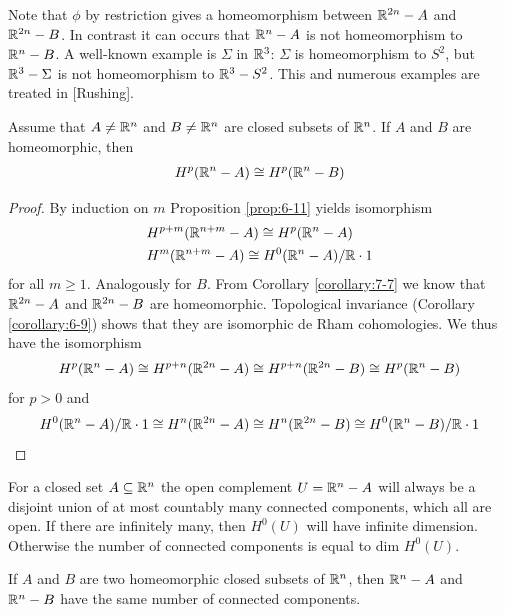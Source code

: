 Note that $\phi$ by restriction gives a homeomorphism between ${\mathbb{R}}^{2n}-A$ and ${\mathbb{R}}^{2n}-B$.
In contrast it can occurs that ${\mathbb{R}}^n-A$ is not homeomorphism to ${\mathbb{R}}^n-B$. A well-known example 
is  $\Sigma$ in ${\mathbb{R}}^3$: $\Sigma$ is homeomorphism to $S^2$, but 
${\mathbb{R}}^3-\Sigma$ is not homeomorphism to ${\mathbb{R}}^3-S^2$. This and numerous examples are treated in [Rushing].


\begin{theorem}\label{theorem:7-8}
  Assume that $A\neq{\ensuremath{\mathbb{R}}}^n$ and $B\neq{\ensuremath{\mathbb{R}}}^n$ are closed subsets of ${\mathbb{R}}^n$. If $A$ and $B$
  are homeomorphic, then 
  \begin{align*}
    H^p({\mathbb{R}}^n-A)\cong H^p({\mathbb{R}}^n-B)
  \end{align*}
\end{theorem}

\begin{proof}
  By induction on $m$ Proposition \ref{prop:6-11} yields isomorphism 
  \begin{align*}
    & H^{p+m}({\mathbb{R}}^{n+m}-A)\cong H^p({\mathbb{R}}^n-A) \\
    & H^{m}({\mathbb{R}}^{n+m}-A)\cong H^0({\mathbb{R}}^n-A)/{\mathbb{R}}\cdot 1 
  \end{align*}
  for all $m\ge 1$. Analogously for $B$. From Corollary \ref{corollary:7-7} we know that ${\mathbb{R}}^{2n}-A$
  and ${\mathbb{R}}^{2n}-B$ are homeomorphic. Topological invariance (Corollary \ref{corollary:6-9}) shows that 
  they are isomorphic de Rham cohomologies. We thus have the isomorphism
  \begin{align*}
    H^p({\mathbb{R}}^n-A) 
      \cong H^{p+n}({\mathbb{R}}^{2n}-A) 
      \cong H^{p+n}({\mathbb{R}}^{2n}-B)
      \cong H^p({\mathbb{R}}^n-B)
  \end{align*}
  for $p>0$ and 
  \begin{align*}
    H^0({\mathbb{R}}^n-A)/{\mathbb{R}}\cdot 1 \cong H^n({\mathbb{R}}^{2n}-A) \cong H^n({\mathbb{R}}^{2n}-B) \cong H^0({\mathbb{R}}^n-B)/{\mathbb{R}}\cdot 1
  \end{align*}
\end{proof}

For a closed set $A\subseteq{\ensuremath{\mathbb{R}}}^n$ the open complement $U={\mathbb{R}}^n-A$ will always be
a disjoint union of at most countably many connected components, which all
are open. If there are infinitely many, then $H^0(U)$ will have infinite dimension.
Otherwise the number of connected components is equal to dim $H^0(U)$.


\begin{corollary}\label{corollary:7-9}
  If $A$ and $B$ are two homeomorphic closed subsets of ${\mathbb{R}}^n$, then ${\mathbb{R}}^n-A$
and ${\mathbb{R}}^n- B$ have the same number of connected components.
\end{corollary}



